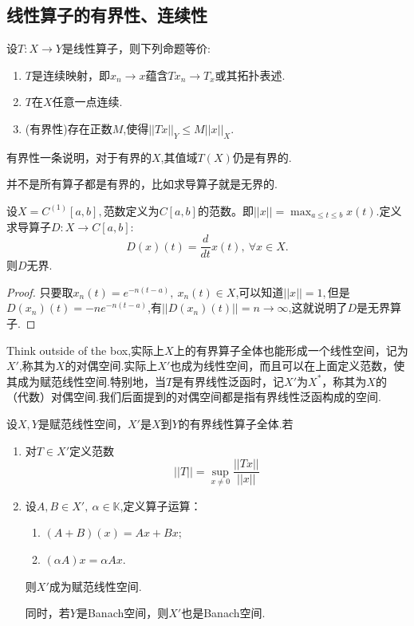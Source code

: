 \documentclass[lang=cn,10pt]{elegantbook}
\begin{document}
	\subsection{线性算子的有界性、连续性}
	\begin{theorem}[连续性和有界性(2.1.1)]
		设\(T:X\rightarrow{Y}\)是线性算子，则下列命题等价:
		\begin{enumerate}
			\item \(T\)是连续映射，即\(x_n\to x\)蕴含\(Tx_n\to T_x\)或其拓扑表述.
			\item \(T\)在\(X\)任意一点连续.
			\item (有界性)存在正数\(M\),使得\(||Tx||_Y\le M||x||_X.\)
		\end{enumerate}
	\end{theorem}
	\begin{note}
		有界性一条说明，对于有界的\(X\),其值域\(T(X)\)仍是有界的.
	\end{note}
	并不是所有算子都是有界的，比如求导算子就是无界的.
	\begin{example}
		设\(X=C^{(1)}[a,b],\)范数定义为\(C[a,b]\)的范数。即\(||x||=\max_{a\le t\le b}x(t)\).定义求导算子\(D:X\to C[a,b]\):
		\[D(x)(t)=\frac{d}{dt}x(t),\ \forall x \in X.\]
		则\(D\)无界.
		\begin{proof}
			只要取\(x_n(t)=e^{-n(t-a)},\ x_n(t)\in X\),可以知道\(||x||=1,\)但是\(D(x_n)(t)=-ne^{-n(t-a)}\),有\(||D(x_n)(t)||=n\to \infty\),这就说明了\(D\)是无界算子.
		\end{proof}
	\end{example}
	Think outside of the box,实际上\(X\)上的有界算子全体也能形成一个线性空间，记为\(X'\),称其为\(X\)的对偶空间.实际上\(X'\)也成为线性空间，而且可以在上面定义范数，使其成为赋范线性空间.特别地，当\(T\)是有界线性泛函时，记\(X'\)为\(X^*\)，称其为\(X\)的（代数）对偶空间.我们后面提到的对偶空间都是指有界线性泛函构成的空间.
	\begin{theorem}[对偶空间(2.1.2)]
		设\(X,Y\)是赋范线性空间，\(X'\)是\(X\)到\(Y\)的有界线性算子全体.若
		\begin{enumerate}
			\item 对\(T\in X'\)定义范数\[||T||=\sup_{x\ne 0}\frac{||Tx||}{||x||}\]
			\item 设\(A,B\in X',\ \alpha\in \mathbb{K}\),定义算子运算：
			\begin{enumerate}
				\item \((A+B)(x)=Ax+Bx\);
				\item \((\alpha A)x=\alpha Ax\).
			\end{enumerate}
			则\(X'\)成为赋范线性空间.
			
			同时，若\(Y\)是Banach空间，则\(X'\)也是Banach空间.
		\end{enumerate}
	\end{theorem}
\end{document}
